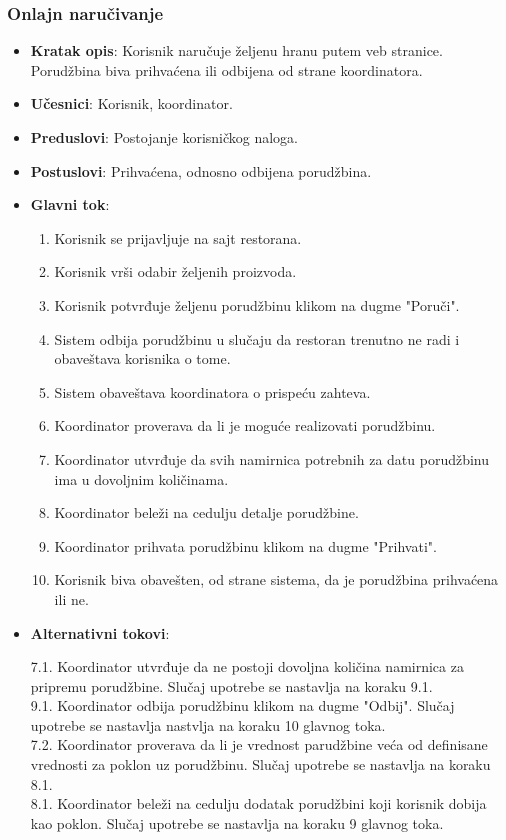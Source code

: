 \subsubsection{Onlajn naručivanje}
\begin{itemize}
    \item \textbf{Kratak opis}: Korisnik naručuje željenu hranu putem veb stranice. Porudžbina biva prihvaćena ili odbijena od strane koordinatora.
    \item \textbf{Učesnici}: Korisnik, koordinator.
    \item \textbf{Preduslovi}: Postojanje korisničkog naloga.
    \item \textbf{Postuslovi}: Prihvaćena, odnosno odbijena porudžbina.
    \item \textbf{Glavni tok}:
    \begin{enumerate}
        \item Korisnik se prijavljuje na sajt restorana.
        \item Korisnik vrši odabir željenih proizvoda.
        \item Korisnik potvrđuje željenu porudžbinu klikom na dugme "Poruči".
        \item Sistem odbija porudžbinu u slučaju da restoran trenutno ne radi i obaveštava korisnika o tome.
        \item Sistem obaveštava koordinatora o prispeću zahteva.
        \item Koordinator proverava da li je moguće realizovati porudžbinu.
        \item Koordinator utvrđuje da svih namirnica potrebnih za datu porudžbinu ima u dovoljnim količinama.
        \item Koordinator beleži na cedulju detalje porudžbine.
        \item Koordinator prihvata porudžbinu klikom na dugme "Prihvati".
        \item Korisnik biva obavešten, od strane sistema, da je porudžbina prihvaćena ili ne.
     \end{enumerate}
     \item \textbf{Alternativni tokovi}:
     
     7.1. Koordinator utvrđuje da ne postoji dovoljna količina namirnica za pripremu porudžbine. Slučaj upotrebe se nastavlja na koraku 9.1.\\
     9.1. Koordinator odbija porudžbinu klikom na dugme "Odbij". Slučaj upotrebe se nastavlja  nastvlja na koraku 10 glavnog toka.\\
     7.2. Koordinator proverava da li je vrednost parudžbine veća od definisane vrednosti za poklon uz porudžbinu. Slučaj upotrebe se nastavlja na koraku 8.1.\\
     8.1. Koordinator beleži na cedulju dodatak porudžbini koji korisnik dobija kao poklon. Slučaj upotrebe se nastavlja na koraku 9 glavnog toka.\\
    
\end{itemize}

